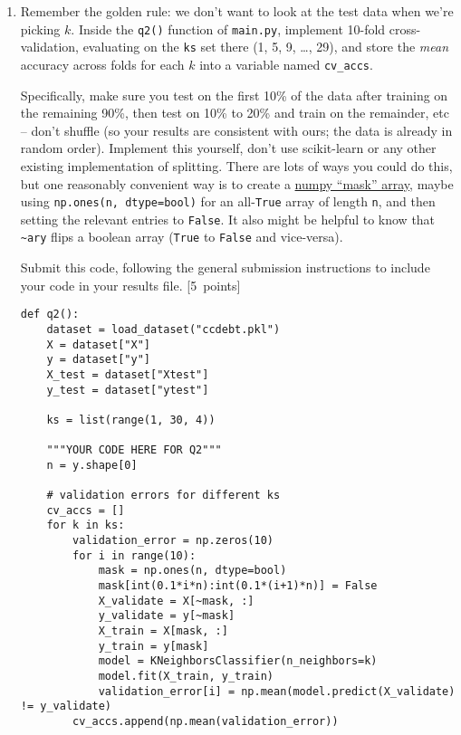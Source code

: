 \documentclass{article}
\newcommand{\blu}[1]{{\textcolor{blu}{#1}}}
\let\ask\blu
\newcommand\pts[1]{\textcolor{pointscolour}{[#1~points]}}
\begin{document}
    \begin{enumerate}
        \item Remember the golden rule: we don't want to look at the test data when we're picking $k$. Inside the \texttt{q2()} function of \texttt{main.py}, implement 10-fold cross-validation, evaluating on the \texttt{ks} set there (1, 5, 9, \dots, 29), and store the \emph{mean} accuracy across folds for each $k$ into a variable named \texttt{cv\_accs}.

        Specifically, make sure you test on the first 10\% of the data after training on the remaining 90\%, then test on 10\% to 20\% and train on the remainder, etc -- don't shuffle (so your results are consistent with ours; the data is already in random order). Implement this yourself, don't use scikit-learn or any other existing implementation of splitting. There are lots of ways you could do this, but one reasonably convenient way is to create a \href{https://numpy.org/doc/stable/user/basics.indexing.html#boolean-or-mask-index-arrays}{numpy ``mask'' array}, maybe using \texttt{np.ones(n, dtype=bool)} for an all-\texttt{True} array of length \texttt{n}, and then setting the relevant entries to \texttt{False}. It also might be helpful to know that \texttt{\textasciitilde ary} flips a boolean array (\texttt{True} to \texttt{False} and vice-versa).

        \ask{Submit this code}, following the general submission instructions to include your code in your results file. \pts{5}
        \begin{verbatim}
def q2():
    dataset = load_dataset("ccdebt.pkl")
    X = dataset["X"]
    y = dataset["y"]
    X_test = dataset["Xtest"]
    y_test = dataset["ytest"]

    ks = list(range(1, 30, 4))

    """YOUR CODE HERE FOR Q2"""
    n = y.shape[0]

    # validation errors for different ks
    cv_accs = []
    for k in ks:
        validation_error = np.zeros(10)
        for i in range(10):
            mask = np.ones(n, dtype=bool)
            mask[int(0.1*i*n):int(0.1*(i+1)*n)] = False
            X_validate = X[~mask, :]
            y_validate = y[~mask]
            X_train = X[mask, :]
            y_train = y[mask]
            model = KNeighborsClassifier(n_neighbors=k)
            model.fit(X_train, y_train)
            validation_error[i] = np.mean(model.predict(X_validate) != y_validate)
        cv_accs.append(np.mean(validation_error))
    

\end{verbatim}
\end{enumerate}
\end{document}
